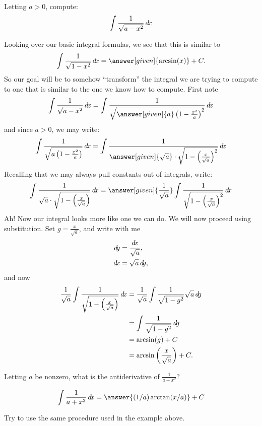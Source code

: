 \documentclass{ximera}
\begin{document}
\begin{example}
  Letting $a>0$, compute:
  \[
  \int \frac{1}{\sqrt{a-x^2}} \mathop{}\!d\! x
  \]
  \begin{explanation}
    Looking over our basic integral formulas, we see that this is similar to
    \[
    \int \frac{1}{\sqrt{1-x^2}}\d x= \answer[given]{\arcsin(x)}+C.
    \]
    So our goal will be to somehow ``transform'' the integral we are
    trying to compute to one that is similar to the one we know how to
    compute. First note
    \[
    \int \frac{1}{\sqrt{a-x^2}} \d x  =
    \int \frac{1}{\sqrt{\answer[given]{a}\left(1-\frac{x^2}{a}\right)^2}} \d x
    \]
    and since $a>0$, we may write:
    \[
    \int \frac{1}{\sqrt{a\left(1-\frac{x^2}{a}\right)}} \d x=
    \int \frac{1}{\answer[given]{\sqrt{a}}\cdot \sqrt{1-\left(\frac{x}{\sqrt{a}}\right)^2}} \d x
    \]
    Recalling that we may always pull constants out of integrals, write:
    \[
    \int \frac{1}{\sqrt{a}\cdot \sqrt{1-\left(\frac{x}{\sqrt{a}}\right)}} \d x = 
    \answer[given]{\frac{1}{\sqrt{a}}}\int \frac{1}{\sqrt{1-\left(\frac{x}{\sqrt{a}}\right)^2}} \d x 
    \]
    Ah! Now our integral looks more like one we can do. We will now
    proceed using substitution. Set $g = \frac{x}{\sqrt{a}}$, and write with me
    \begin{align*}
      \d g &= \frac{\d x}{\sqrt{a}},\\
      \d x &= \sqrt{a}\d g,
    \end{align*}
    and now
    \begin{align*}
    \frac{1}{\sqrt{a}}\int \frac{1}{\sqrt{1-\left(\frac{x}{\sqrt{a}}\right)}} \mathop{}\!d\! x &=
    \frac{1}{\sqrt{a}}\int \frac{1}{\sqrt{1-g^2}} \sqrt{a} \mathop{}\!d\! g\\
    &=\int \frac{1}{\sqrt{1-g^2}}\mathop{}\!d\! g\\
    &=\arcsin(g) + C\\
    &=\arcsin\left(\frac{x}{\sqrt{a}}\right) + C.
    \end{align*}
  \end{explanation}
\end{example}





\begin{question}
  Letting $a$ be nonzero, what is the antiderivative of $\frac{1}{a +
    x^2}$?
  \begin{prompt}%
    \[
    \int \frac{1}{a + x^2} \d x = \answer{(1/a) \arctan(x/a)}+C
    \]
  \end{prompt}
  \begin{hint}
    Try to use the same procedure used in the example above.
  \end{hint}
\end{question}
\end{document}
